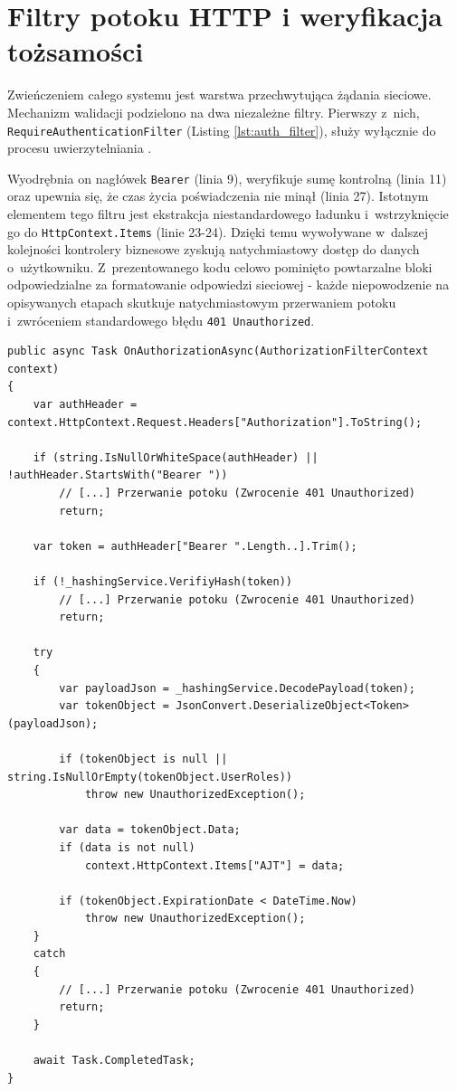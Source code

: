 \documentclass{SGGW-thesis}
\begin{document}
\section{Filtry potoku HTTP i weryfikacja tożsamości}

Zwieńczeniem całego systemu jest warstwa przechwytująca żądania sieciowe. Mechanizm walidacji podzielono na dwa niezależne filtry. Pierwszy z~nich, \texttt{RequireAuthenticationFilter} (Listing \ref{lst:auth_filter}), służy wyłącznie do procesu uwierzytelniania \cite{ms_sec}. 

Wyodrębnia on nagłówek \texttt{Bearer} (linia 9), weryfikuje sumę kontrolną (linia 11) oraz upewnia się, że czas życia poświadczenia nie minął (linia 27). Istotnym elementem tego filtru jest ekstrakcja niestandardowego ładunku i~wstrzyknięcie go do \texttt{HttpContext.Items} (linie 23-24). Dzięki temu wywoływane w~dalszej kolejności kontrolery biznesowe zyskują natychmiastowy dostęp do danych o~użytkowniku. Z~prezentowanego kodu celowo pominięto powtarzalne bloki odpowiedzialne za formatowanie odpowiedzi sieciowej - każde niepowodzenie na opisywanych etapach skutkuje natychmiastowym przerwaniem potoku i~zwróceniem standardowego błędu \texttt{401 Unauthorized}.

\clearpage
\begin{lstlisting}[caption={Filtr potoku HTTP weryfikujący autentyczność tokenu}, label={lst:auth_filter}]
public async Task OnAuthorizationAsync(AuthorizationFilterContext context)
{
    var authHeader = context.HttpContext.Request.Headers["Authorization"].ToString();

    if (string.IsNullOrWhiteSpace(authHeader) || !authHeader.StartsWith("Bearer "))
        // [...] Przerwanie potoku (Zwrocenie 401 Unauthorized)
        return;

    var token = authHeader["Bearer ".Length..].Trim();

    if (!_hashingService.VerifiyHash(token))
        // [...] Przerwanie potoku (Zwrocenie 401 Unauthorized)
        return;

    try
    {
        var payloadJson = _hashingService.DecodePayload(token);
        var tokenObject = JsonConvert.DeserializeObject<Token>(payloadJson);
        
        if (tokenObject is null || string.IsNullOrEmpty(tokenObject.UserRoles))
            throw new UnauthorizedException();
            
        var data = tokenObject.Data;
        if (data is not null)
            context.HttpContext.Items["AJT"] = data;

        if (tokenObject.ExpirationDate < DateTime.Now)
            throw new UnauthorizedException();
    }
    catch
    {
        // [...] Przerwanie potoku (Zwrocenie 401 Unauthorized)
        return;
    }

    await Task.CompletedTask;
}
\end{lstlisting}
\end{document}
